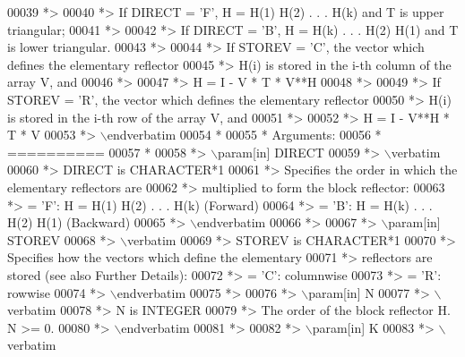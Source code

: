 \begin{DoxyCode}
00039 \textcolor{comment}{*>}
00040 \textcolor{comment}{*> If DIRECT = 'F', H = H(1) H(2) . . . H(k) and T is upper triangular;}
00041 \textcolor{comment}{*>}
00042 \textcolor{comment}{*> If DIRECT = 'B', H = H(k) . . . H(2) H(1) and T is lower triangular.}
00043 \textcolor{comment}{*>}
00044 \textcolor{comment}{*> If STOREV = 'C', the vector which defines the elementary reflector}
00045 \textcolor{comment}{*> H(i) is stored in the i-th column of the array V, and}
00046 \textcolor{comment}{*>}
00047 \textcolor{comment}{*>    H  =  I - V * T * V**H}
00048 \textcolor{comment}{*>}
00049 \textcolor{comment}{*> If STOREV = 'R', the vector which defines the elementary reflector}
00050 \textcolor{comment}{*> H(i) is stored in the i-th row of the array V, and}
00051 \textcolor{comment}{*>}
00052 \textcolor{comment}{*>    H  =  I - V**H * T * V}
00053 \textcolor{comment}{*> \(\backslash\)endverbatim}
00054 \textcolor{comment}{*}
00055 \textcolor{comment}{*  Arguments:}
00056 \textcolor{comment}{*  ==========}
00057 \textcolor{comment}{*}
00058 \textcolor{comment}{*> \(\backslash\)param[in] DIRECT}
00059 \textcolor{comment}{*> \(\backslash\)verbatim}
00060 \textcolor{comment}{*>          DIRECT is CHARACTER*1}
00061 \textcolor{comment}{*>          Specifies the order in which the elementary reflectors are}
00062 \textcolor{comment}{*>          multiplied to form the block reflector:}
00063 \textcolor{comment}{*>          = 'F': H = H(1) H(2) . . . H(k) (Forward)}
00064 \textcolor{comment}{*>          = 'B': H = H(k) . . . H(2) H(1) (Backward)}
00065 \textcolor{comment}{*> \(\backslash\)endverbatim}
00066 \textcolor{comment}{*>}
00067 \textcolor{comment}{*> \(\backslash\)param[in] STOREV}
00068 \textcolor{comment}{*> \(\backslash\)verbatim}
00069 \textcolor{comment}{*>          STOREV is CHARACTER*1}
00070 \textcolor{comment}{*>          Specifies how the vectors which define the elementary}
00071 \textcolor{comment}{*>          reflectors are stored (see also Further Details):}
00072 \textcolor{comment}{*>          = 'C': columnwise}
00073 \textcolor{comment}{*>          = 'R': rowwise}
00074 \textcolor{comment}{*> \(\backslash\)endverbatim}
00075 \textcolor{comment}{*>}
00076 \textcolor{comment}{*> \(\backslash\)param[in] N}
00077 \textcolor{comment}{*> \(\backslash\)verbatim}
00078 \textcolor{comment}{*>          N is INTEGER}
00079 \textcolor{comment}{*>          The order of the block reflector H. N >= 0.}
00080 \textcolor{comment}{*> \(\backslash\)endverbatim}
00081 \textcolor{comment}{*>}
00082 \textcolor{comment}{*> \(\backslash\)param[in] K}
00083 \textcolor{comment}{*> \(\backslash\)verbatim}

\end{DoxyCode}
